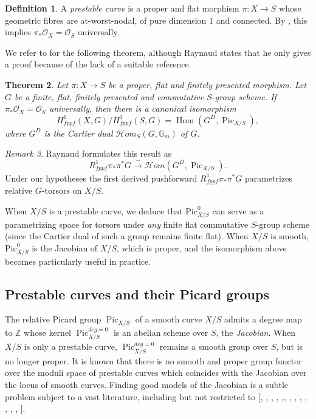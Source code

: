\documentclass[a4paper,11pt]{amsart} %
\numberwithin{equation}{subsection}
\newcommand{\on}[1]{\operatorname{#1}}
\newcommand{\bb}[1]{{\mathbb{#1}}}
\newcommand{\ca}[1]{{\mathcal{#1}}}
\def\sheafhom{\mathcal{H}om}
\newcommand{\lra}{\longrightarrow}
\newcommand{\iso}{\stackrel{\sim}{\lra}}
\theoremstyle{definition}
\newtheorem{definition}{Definition}[section]
\theoremstyle{plain}%
\newtheorem{theorem}[definition]{Theorem}
\theoremstyle{remark}
\newtheorem{remark}[definition]{Remark}
\begin{document}
\begin{definition}\label{definition:prestable}
    A \emph{prestable curve} is a proper and flat morphism $\pi \colon X \to S$ whose geometric fibres are at-worst-nodal, of pure dimension $1$ and connected. By \cite[\href{https://stacks.math.columbia.edu/tag/0E6L}{Tag 0E6L}]{stacks-project}, this implies $\pi_*\ca O_X=\ca O_S$ universally.
\end{definition}

We refer to \cite[Proposition 6.2.1]{Raynaud1970Specialisation-} for the following theorem, although Raynaud states that he only gives a proof because of the lack of a suitable reference.

\begin{theorem}\label{theorem:Raynaud}
    Let $\pi \colon X \to S$ be a proper, flat and finitely presented morphism. Let $G$ be a finite, flat, finitely presented and commutative $S$-group scheme. If $\pi_*\ca O_X=\ca O_S$ universally, then there is a canonical isomorphism
    \begin{equation}\label{eqn:Raynaud}
        H^1_{fppf}(X,G)/H^1_{fppf}(S,G) = \on{Hom}(G^D,\on{Pic}_{X/S}),
    \end{equation}
    where $G^D$ is the Cartier dual $\sheafhom_S(G,\bb G_m)$ of $G$.
\end{theorem}

\begin{remark}
    Raynaud formulates this result as
    \[
    R^1_{fppf}\pi_*\pi^*G \iso \sheafhom(G^D,\on{Pic}_{X/S}).
    \]
    Under our hypotheses the first derived pushforward $R^1_{fppf}\pi_*\pi^*G$ parametrizes relative $G$-torsors on $X/S$.
\end{remark}
When $X/S$ is a prestable curve, we deduce that $\mathrm{Pic}^{0}_{X/S}$ can serve as a parametrizing space for torsors under \emph{any} finite flat commutative $S$-group scheme (since the Cartier dual of such a group remains finite flat). When \( X/S \) is smooth, \( \mathrm{Pic}^{0}_{X/S} \) is the Jacobian of \( X/S \), which is proper, and the isomorphism above becomes particularly useful in practice.


\subsection{Prestable curves and their Picard groups}\label{Prestable}

The relative Picard group $\on{Pic}_{X/S}$ of a smooth curve $X/S$ admits a degree map to $\bb Z$ whose kernel $\on{Pic}^{deg=0}_{X/S}$ is an abelian scheme over $S$, the \emph{Jacobian}. When $X/S$ is only a prestable curve, $\on{Pic}^{deg=0}_{X/S}$ remains a smooth group over $S$, but is no longer proper. It is known that there is no smooth and proper group functor over the moduli space of prestable curves which coincides with the Jacobian over the locus of smooth curves. Finding good models of the Jacobian is a subtle problem subject to a vast literature, including but not restricted to [\cite{Ishi}, \cite{DSouza},
\cite{OdaSeshadri}, \cite{AltmanK80}, \cite{AltmanK79},\cite{Kajiwara}, \cite{Caporaso}, \cite{Pandharipande}, \cite{Jarvis}, \cite{Esteves}, \cite{CaporasoL}, \cite{CaporasoLu}, \cite{Melo}, \cite{Chiodo}].
\end{document}
